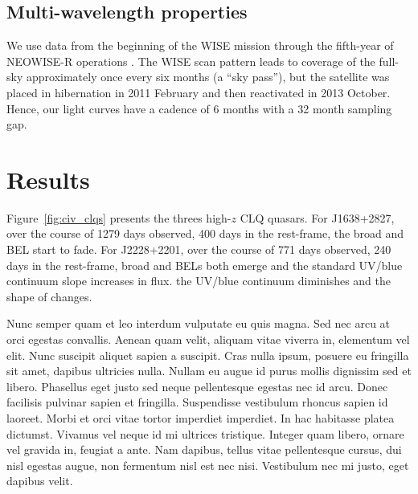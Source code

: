 \documentclass[a4paper,fleqn,usenatbib]{mnras}
\begin{document}
\subsection{Multi-wavelength properties}
We use data from the beginning of the WISE mission \citep[2010
January; ][]{Wright2010} through the fifth-year of NEOWISE-R
operations \citep[2018 December; ][]{Mainzer2011}. The WISE scan
pattern leads to coverage of the full-sky approximately once every six
months (a ``sky pass''), but the satellite was placed in hibernation
in 2011 February and then reactivated in 2013 October. Hence, our
light curves have a cadence of 6 months with a 32 month sampling gap.



\section{Results}
Figure~\ref{fig:civ_clqs} presents the threes high-$z$ CLQ quasars. 
For J1638+2827, over the course of 1279 days observed, 400 days in the
rest-frame, the broad \civ and \ciii BEL start to fade.  For
J2228+2201, over the course of 771 days observed, 240 days in the
rest-frame, broad \civ and \ciii BELs both emerge and the standard
UV/blue continuum slope increases in flux.  the UV/blue continuum
diminishes and the shape of \lya changes.

Nunc semper quam et leo interdum vulputate eu quis magna. Sed nec arcu
at orci egestas convallis. Aenean quam velit, aliquam vitae viverra
in, elementum vel elit. Nunc suscipit aliquet sapien a suscipit. Cras
nulla ipsum, posuere eu fringilla sit amet, dapibus ultricies
nulla. Nullam eu augue id purus mollis dignissim sed et
libero. Phasellus eget justo sed neque pellentesque egestas nec id
arcu. Donec facilisis pulvinar sapien et fringilla. Suspendisse
vestibulum rhoncus sapien id laoreet. Morbi et orci vitae tortor
imperdiet imperdiet. In hac habitasse platea dictumst. Vivamus vel
neque id mi ultrices tristique. Integer quam libero, ornare vel
gravida in, feugiat a ante. Nam dapibus, tellus vitae pellentesque
cursus, dui nisl egestas augue, non fermentum nisl est nec
nisi. Vestibulum nec mi justo, eget dapibus velit.
\end{document}
